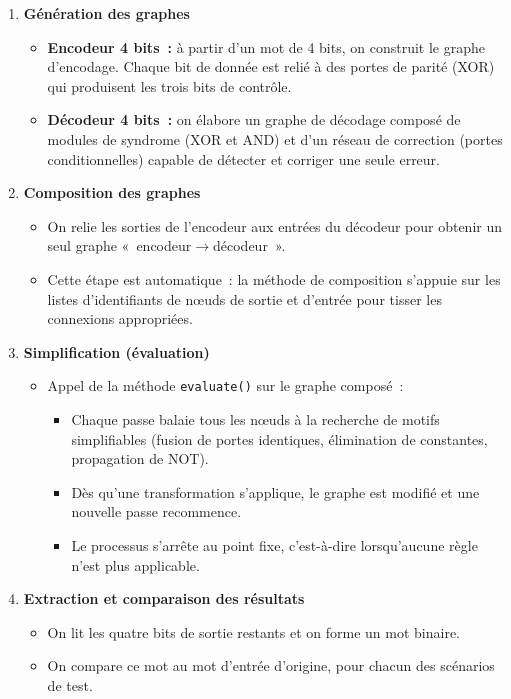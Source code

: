 \documentclass[a4paper,12pt]{article}
\begin{document}
\begin{enumerate}
    \item \textbf{Génération des graphes}
    \begin{itemize}
        \item \textbf{Encodeur 4 bits~:} à partir d’un mot de 4 bits, on construit le graphe d’encodage. Chaque bit de donnée est relié à des portes de parité (XOR) qui produisent les trois bits de contrôle.
        \item \textbf{Décodeur 4 bits~:} on élabore un graphe de décodage composé de modules de syndrome (XOR et AND) et d’un réseau de correction (portes conditionnelles) capable de détecter et corriger une seule erreur.
    \end{itemize}

    \item \textbf{Composition des graphes}
    \begin{itemize}
        \item On relie les sorties de l’encodeur aux entrées du décodeur pour obtenir un seul graphe «~encodeur$\rightarrow$décodeur~».
        \item Cette étape est automatique~: la méthode de composition s’appuie sur les listes d’identifiants de nœuds de sortie et d’entrée pour tisser les connexions appropriées.
    \end{itemize}

    \item \textbf{Simplification (évaluation)}
    \begin{itemize}
        \item Appel de la méthode \texttt{evaluate()} sur le graphe composé~:
        \begin{itemize}
            \item Chaque passe balaie tous les nœuds à la recherche de motifs simplifiables (fusion de portes identiques, élimination de constantes, propagation de NOT).
            \item Dès qu’une transformation s’applique, le graphe est modifié et une nouvelle passe recommence.
            \item Le processus s’arrête au point fixe, c’est-à-dire lorsqu’aucune règle n’est plus applicable.
        \end{itemize}
    \end{itemize}

    \item \textbf{Extraction et comparaison des résultats}
    \begin{itemize}
        \item On lit les quatre bits de sortie restants et on forme un mot binaire.
        \item On compare ce mot au mot d’entrée d’origine, pour chacun des scénarios de test.
    \end{itemize}
\end{enumerate}
\end{document}
